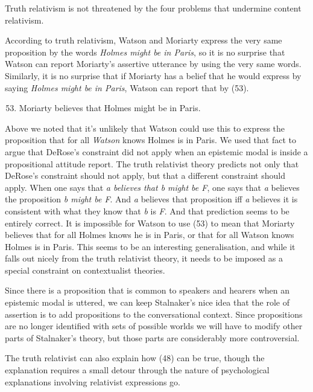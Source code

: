 Truth relativism is not threatened by the four problems that undermine content relativism.
 
According to truth relativism, Watson and Moriarty express the very same proposition by the words \textit{Holmes might be in Paris}, so it is no surprise that Watson can report Moriarty's assertive utterance by using the very same words. Similarly, it is no surprise that if Moriarty has a belief that he would express by saying \textit{Holmes might be in Paris}, Watson can report that by (53).
 
\begin{enumerate}
\setcounter{enumi}{52} 
\item Moriarty believes that Holmes might be in Paris.
 \end{enumerate}

\noindent Above we noted that it's unlikely that Watson could use this to express the proposition that for all \textit{Watson} knows Holmes is in Paris. We used that fact to argue that DeRose's constraint did not apply when an epistemic modal is inside a propositional attitude report. The truth relativist theory predicts not only that DeRose's constraint should not apply, but that a different constraint should apply. When one says that \textit{a believes that b might be F}, one says that \textit{a} believes the proposition \textit{b might be F}. And \textit{a} believes that proposition iff \textit{a }believes it is consistent with what they know that \textit{b} is \textit{F}. And that prediction seems to be entirely correct. It is impossible for Watson to use (53) to mean that Moriarty believes that for all Holmes knows he is in Paris, or that for all Watson knows Holmes is in Paris. This seems to be an interesting generalisation, and while it falls out nicely from the truth relativist theory, it needs to be imposed as a special constraint on contextualist theories.
 
Since there is a proposition that is common to speakers and hearers when an epistemic modal is uttered, we can keep Stalnaker's nice idea that the role of assertion is to add propositions to the conversational context. Since propositions are no longer identified with sets of possible worlds we will have to modify other parts of Stalnaker's theory, but those parts are considerably more controversial.
 
The truth relativist can also explain how (48) can be true, though the explanation requires a small detour through the nature of psychological explanations involving relativist expressions go.
 

